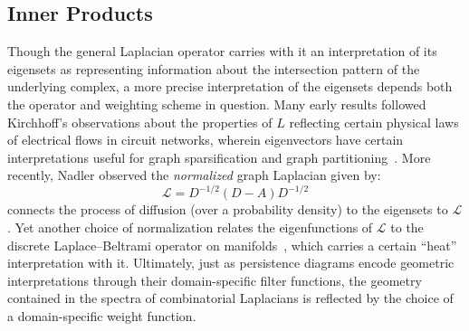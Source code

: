 \documentclass[10pt]{article}
\numberwithin{equation}{section}
\newcommand{\+}{%
	\raisebox{0.18ex}{\scaleobj{0.55}{+}}
}
\theoremstyle{definition}
\theoremstyle{definition}
\begin{document}
\subsection*{Inner Products}\label{sec:inner_products}
Though the general Laplacian operator carries with it an interpretation of its eigensets as representing information about the intersection pattern of the underlying complex, a more precise interpretation of the eigensets depends both the operator and weighting scheme in question.
Many early results followed Kirchhoff's observations about the properties of $L$ reflecting certain physical laws of electrical flows in circuit networks, wherein eigenvectors have certain interpretations useful for graph sparsification and graph partitioning~\cite{chung1997spectral}. 
More recently, Nadler observed the \emph{normalized} graph Laplacian given by: 
\begin{equation}\label{eq:normal_graph_laplacian}
\mathcal{L} = D^{-1/2}(D - A) D^{-1/2}
\end{equation}
connects the process of diffusion (over a probability density) to the eigensets to $\mathcal{L}$.
Yet another choice of normalization relates the eigenfunctions of $\mathcal{L}$ to the discrete Laplace–Beltrami operator on manifolds~\cite{}, which carries a certain ``heat'' interpretation with it. 
Ultimately, just as persistence diagrams encode geometric interpretations through their domain-specific filter functions, the geometry contained in the spectra of combinatorial Laplacians is reflected by the choice of a domain-specific weight function.




\end{document}
